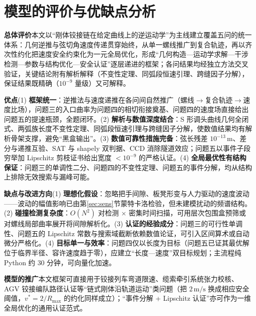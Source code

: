 ﻿\documentclass{cumcmthesis}
\begin{document}
\section{模型的评价与优缺点分析}

\textbf{总体评价}\quad 本文以“刚体铰接链在给定曲线上的逆运动学”为主线建立覆盖五问的统一体系：几何逆推与弦切角速度传递贯穿始终，从单一螺线推广到复合轨迹，再以齐次性约化把速度安全约束化为一元全局优化，形成“几何构造—运动学求解—干涉检测—参数与结构优化—安全认证”逐层递进的框架；各问结果均经独立方法交叉验证，关键结论附有解析解释（不变性定理、同弧段恒速引理、跨缝因子分解），保证结果既精确（$10^{-9}$ 量级）又可解释。

\textbf{优点}\quad (1) \textbf{框架统一}：逆推法与速度递推在各问间自然推广（螺线$\to$复合轨迹$\to$速度比场），问题三的入口曲率为问题四的相切衔接奠基、问题四的速度场直接给出问题五的提速瓶颈，全题闭环。(2) \textbf{解析与数值深度结合}：S 形调头曲线几何全闭式、两弧族长度不变性定理、同弧段恒速引理与跨缝因子分解，使数值结果均有解析骨架支撑，避免“黑盒输出”。(3) \textbf{数值可靠性措施完备}：弦长残差 $10^{-13}\,\text{m}$、差分与递推互验、SAT 与 shapely 双判据、CCD 消除隧道效应；问题五以事件子段穷举加 Lipschitz 剪枝证书给出宽度 $<10^{-9}$ 的严格认证。(4) \textbf{全局最优性有结构保证}：问题三的单调性二分、问题四的不变性定理、问题五的事件分解，均从结构上排除无效搜索与漏峰可能。

\textbf{缺点与改进方向}\quad (1) \textbf{理想化假设}：忽略把手间隙、板凳形变与人力驱动的速度波动——波动的幅值影响已由第\ref{sec:sens}节蒙特卡洛检验，但未建模扰动的频谱结构。(2) \textbf{碰撞检测复杂度}：$O(N^{2})$ 对检测 $\times$ 密集时间扫描，可用层次包围盒预筛或对螺线局部曲率展开将间隙解析化。(3) \textbf{认证的经验成分}：问题三的可行性单调性、问题五的 Lipschitz 常数与搜索域截断依赖数值论证，可引入区间算术或自动微分严格化。(4) \textbf{目标单一与效率}：问题四仅以长度为目标（问题五已证其最优解位于临界半径、容许速度趋于零），应建立“长度—速度”双目标规划；主流程纯 Python 约 $30$ 分钟，可向量化加速。

\textbf{模型的推广}\quad 本文框架可直接用于铰接列车弯道限速、缆索牵引系统张力校核、AGV 铰接编队路径认证等“链式刚体沿轨道运动”类问题（把 $2\,\text{m/s}$ 换成相应安全阈值，$v^{*}=2/R_{\max}$ 的约化同样成立）；“事件分解 + Lipschitz 认证”亦可作为一维全局优化的通用认证范式。
\end{document}
